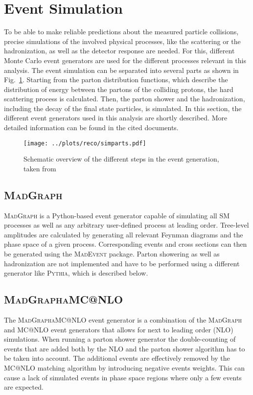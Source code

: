 \section{Event Simulation}
\label{sec:MC}
To be able to make reliable predictions about the measured particle collisions, precise simulations of the involved physical processes, like the scattering or the hadronization, as well as the detector response are needed. For this, different Monte Carlo event generators are used for the different processes relevant in this analysis. The event simulation can be separated into several parts as shown in Fig.~\ref{fig:reco:simparts}. Starting from the parton distribution functions, which describe the distribution of energy between the partons of the colliding protons, the hard scattering process is calculated. Then, the parton shower and the hadronization, including the decay of the final state particles, is simulated.  In this section, the different event generators used in this analysis are shortly described. More detailed information can be found in the cited documents. 
\begin{figure}
    \centering
    \texttt{[image: ../plots/reco/simparts.pdf]}
    \caption[Schemaric overview of the different steps in the event generation]{Schematic overview of the different steps in the event generation, taken from \cite{MCfig}}
    \label{fig:reco:simparts}
\end{figure}

\subsection*{\textsc{MadGraph}}
\textsc{MadGraph} \cite{madgraph} is a Python-based event generator capable of simulating all SM processes as well as any arbitrary user-defined process at leading order. Tree-level amplitudes are calculated by generating all relevant Feynman diagrams and the phase space of a given process. Corresponding events and cross sections can then be generated using the \textsc{MadEvent} package. Parton showering as well as hadronization are not implemented and have to be performed using a different generator like \textsc{Pythia}, which is described below.
\subsection*{\textsc{MadGraph\textunderscore aMC@NLO}}
The \textsc{MadGraph\textunderscore aMC@NLO} \cite{madgraph_aMC} event generator is a combination of the \textsc{MadGraph} and \textsc{MC@NLO} \cite{aMC} event generators that allows for next to leading order (NLO) simulations. When running a parton shower generator the double-counting of events that are added both by the NLO and the parton shower algorithm has to be taken into account. The additional events are effectively removed by the \textsc{MC@NLO} matching algorithm by introducing negative events weights. This can cause a lack of simulated events in phase space regions where only a few events are expected.
